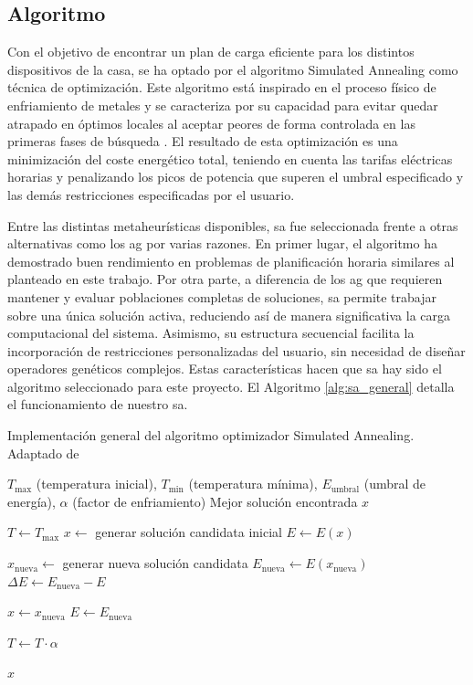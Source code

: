 \documentclass[11pt,a4paper]{book}
\begin{document}
\subsection{Algoritmo}
Con el objetivo de encontrar un plan de carga eficiente para los distintos dispositivos de la casa, se ha optado por el algoritmo Simulated Annealing como técnica de optimización. Este algoritmo está inspirado en el proceso físico de enfriamiento de metales y se caracteriza por su capacidad para evitar quedar atrapado en óptimos locales al aceptar peores de forma controlada en las primeras fases de búsqueda \cite{OptimizationSimulatedAnnealing1983}. El resultado de esta optimización es una minimización del coste energético total, teniendo en cuenta las tarifas eléctricas horarias y penalizando los picos de potencia que superen el umbral especificado y las demás restricciones especificadas por el usuario.

Entre las distintas metaheurísticas disponibles, \gls{sa} fue seleccionada frente a otras alternativas como los \gls{ag} por varias razones. En primer lugar, el algoritmo ha demostrado buen rendimiento en problemas de planificación horaria similares al planteado en este trabajo. Por otra parte, a diferencia de los \gls{ag} que requieren mantener y evaluar poblaciones completas de soluciones, \gls{sa} permite trabajar sobre una única solución activa, reduciendo así de manera significativa la carga computacional del sistema. Asimismo, su estructura secuencial facilita la incorporación de restricciones personalizadas del usuario, sin necesidad de diseñar operadores genéticos complejos. Estas características hacen que \gls{sa} hay sido el algoritmo seleccionado para este proyecto. El Algoritmo \ref{alg:sa_general} detalla el funcionamiento de nuestro \gls{sa}.

\begin{algorithm}
\caption{Implementación general del algoritmo optimizador Simulated Annealing. Adaptado de \cite{simulatedAnnealingAlgoritmo2021}}
\label{alg:sa_general}
\begin{algorithmic}[1]
\REQUIRE $T_{\text{max}}$ (temperatura inicial), $T_{\text{min}}$ (temperatura mínima), $E_{\text{umbral}}$ (umbral de energía), $\alpha$ (factor de enfriamiento)
\ENSURE Mejor solución encontrada $x$

\STATE $T \leftarrow T_{\text{max}}$
\STATE $x \leftarrow$ generar solución candidata inicial
\STATE $E \leftarrow E(x)$ 

    \STATE $x_{\text{nueva}} \leftarrow$ generar nueva solución candidata
    \STATE $E_{\text{nueva}} \leftarrow E(x_{\text{nueva}})$
    \STATE $\Delta E \leftarrow E_{\text{nueva}} - E$

        \STATE $x \leftarrow x_{\text{nueva}}$
        \STATE $E \leftarrow E_{\text{nueva}}$
    \ENDIF

    \STATE $T \leftarrow T \cdot \alpha$ 
\ENDWHILE

\RETURN $x$
\end{algorithmic}
\end{algorithm}
\end{document}
